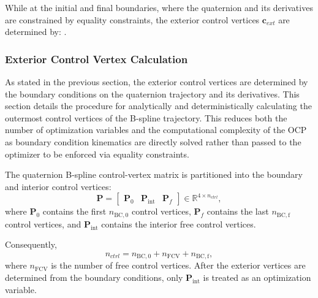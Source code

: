 While at the initial and final boundaries, where the quaternion and its derivatives are constrained by equality constraints, the exterior control vertices $\mathbf{c}_{ext}$ are determined by:
.

\subsubsection{Exterior Control Vertex Calculation}

As stated in the previous section, the exterior control vertices are determined by the boundary conditions on the quaternion trajectory and its derivatives. 
This section details the procedure for analytically and deterministically calculating the outermost control vertices of the B-spline trajectory. 
This reduces both the number of optimization variables and the computational complexity of the OCP as boundary condition kinematics are directly solved rather than passed to the optimizer to be enforced via equality constraints.

The quaternion B-spline control-vertex matrix is partitioned into the
boundary and interior control vertices:
\begin{equation}
    \mathbf{P}
    =
    \begin{bmatrix}
        \mathbf{P}_0 &
        \mathbf{P}_{\mathrm{int}} &
        \mathbf{P}_f
    \end{bmatrix}
    \in
    \mathbb{R}^{4 \times n_{ctrl}},
\end{equation}
where $\mathbf{P}_0$ contains the first $n_{\mathrm{BC,0}}$ control
vertices, $\mathbf{P}_f$ contains the last $n_{\mathrm{BC,f}}$ control
vertices, and $\mathbf{P}_{\mathrm{int}}$ contains the interior free
control vertices.

Consequently,
\begin{equation}
    n_{ctrl}
    =
    n_{\mathrm{BC,0}} + n_{\mathrm{FCV}} + n_{\mathrm{BC,f}},
\end{equation}
where $n_{\mathrm{FCV}}$ is the number of free control vertices. After
the exterior vertices are determined from the boundary conditions, only
$\mathbf{P}_{\mathrm{int}}$ is treated as an optimization variable.

